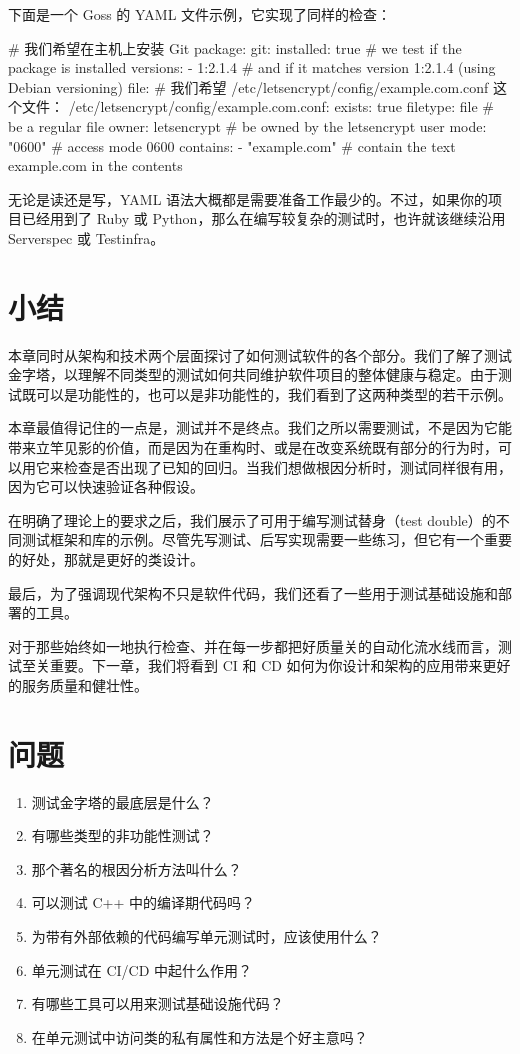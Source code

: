 \label{idx:893}
\label{idx:894}
下面是一个 Goss 的 YAML 文件示例，它实现了同样的检查：

\begin{codebox}[yaml]
# 我们希望在主机上安装 Git
package:
  git:
    installed: true # we test if the package is installed
  versions:
  - 1:2.1.4 # and if it matches version 1:2.1.4 (using Debian versioning)
file:
  # 我们希望 /etc/letsencrypt/config/example.com.conf 这个文件：
  /etc/letsencrypt/config/example.com.conf:
    exists: true
  filetype: file # be a regular file
  owner: letsencrypt # be owned by the letsencrypt user
  mode: "0600" # access mode 0600
  contains:
  - "example.com" # contain the text example.com in the contents
\end{codebox}

无论是读还是写，YAML 语法大概都是需要准备工作最少的。不过，如果你的项目已经用到了 Ruby 或 Python，那么在编写较复杂的测试时，也许就该继续沿用 Serverspec 或 Testinfra。

\section{小结}

本章同时从架构和技术两个层面探讨了如何测试软件的各个部分。我们了解了测试金字塔，以理解不同类型的测试如何共同维护软件项目的整体健康与稳定。由于测试既可以是功能性的，也可以是非功能性的，我们看到了这两种类型的若干示例。

本章最值得记住的一点是，测试并不是终点。我们之所以需要测试，不是因为它能带来立竿见影的价值，而是因为在重构时、或是在改变系统既有部分的行为时，可以用它来检查是否出现了已知的回归。当我们想做根因分析时，测试同样很有用，因为它可以快速验证各种假设。

在明确了理论上的要求之后，我们展示了可用于编写测试替身（test double）的不同测试框架和库的示例。尽管先写测试、后写实现需要一些练习，但它有一个重要的好处，那就是更好的类设计。

最后，为了强调现代架构不只是软件代码，我们还看了一些用于测试基础设施和部署的工具。

对于那些始终如一地执行检查、并在每一步都把好质量关的自动化流水线而言，测试至关重要。下一章，我们将看到 CI 和 CD 如何为你设计和架构的应用带来更好的服务质量和健壮性。

\section{问题}

\begin{enumerate}
\item 测试金字塔的最底层是什么？
\item 有哪些类型的非功能性测试？
\item 那个著名的根因分析方法叫什么？
\item 可以测试 C++ 中的编译期代码吗？
\item 为带有外部依赖的代码编写单元测试时，应该使用什么？
\item 单元测试在 CI/CD 中起什么作用？
\item 有哪些工具可以用来测试基础设施代码？
\item 在单元测试中访问类的私有属性和方法是个好主意吗？
\end{enumerate}

